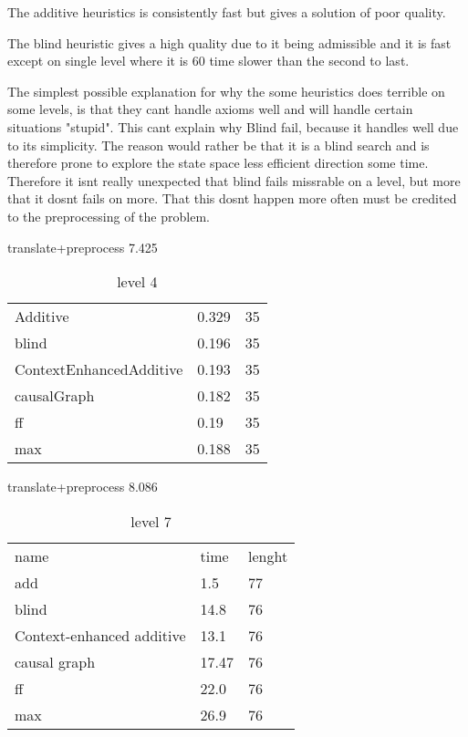 The additive heuristics is consistently fast but gives a solution of poor quality.

The blind heuristic gives a high quality due to it being admissible and it is fast except on single level where it is 60 time slower than the second to last.

The simplest possible explanation for why the some heuristics does terrible on some levels, is that they cant handle axioms well and will handle certain situations "stupid". This cant explain why Blind fail, because it handles well due to its simplicity. The reason would rather be that it is a blind search and is therefore prone to explore the state space less efficient direction some time. Therefore it isnt really unexpected that blind fails missrable on a level, but more that it dosnt fails on more. That this dosnt happen more often must be credited to the preprocessing of the problem.






%
%

	\begin{table}[h]
		\centering
		\caption{level 4}
		\label{prob4}
		translate+preprocess
		7.425\\
		\begin{tabular}{lll}
			
			Additive & 0.329 & 35\\
			blind & 0.196 & 35\\
			ContextEnhancedAdditive & 0.193 & 35\\
			causalGraph & 0.182 & 35\\
			ff & 0.19 & 35\\
			max & 0.188 & 35\\
		\end{tabular}
	\end{table}
	
	\begin{table}[h]
		\centering
		\caption{level 7}
		\label{prob4}
		translate+preprocess
		8.086\\
		\begin{tabular}{lll}
			
			name & time & lenght\\
			add & 1.5 & 77\\
			blind & 14.8 & 76\\
			Context-enhanced additive & 13.1 & 76\\
			causal graph & 17.47 & 76\\
			ff & 22.0 & 76\\
			max & 26.9 & 76\\
		\end{tabular}
	\end{table}
	

